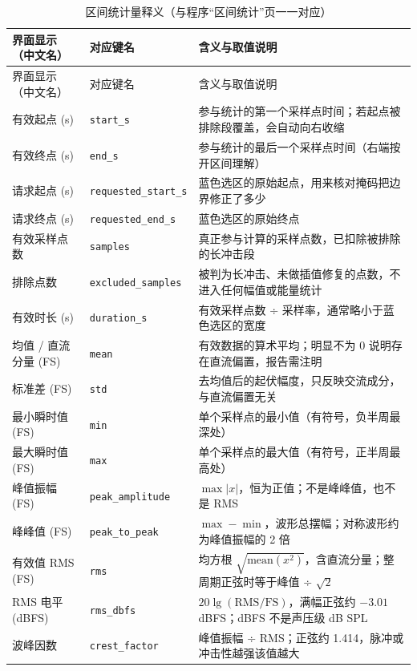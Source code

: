 \documentclass[UTF8,a4paper,12pt,scheme=chinese]{ctexart}
\begin{document}
{\small
\begin{longtable}{@{}p{}p{}p{}@{}}
\caption{区间统计量释义（与程序“区间统计”页一一对应）}\\
\toprule
界面显示（中文名） & 对应键名 & 含义与取值说明 \\
\midrule
\endfirsthead
\toprule
界面显示（中文名） & 对应键名 & 含义与取值说明 \\
\midrule
\endhead
\bottomrule
\endfoot
有效起点 (s) & \texttt{start\_s} & 参与统计的第一个采样点时间；若起点被排除段覆盖，会自动向右收缩 \\
有效终点 (s) & \texttt{end\_s} & 参与统计的最后一个采样点时间（右端按开区间理解） \\
请求起点 (s) & \texttt{requested\_start\_s} & 蓝色选区的原始起点，用来核对掩码把边界修正了多少 \\
请求终点 (s) & \texttt{requested\_end\_s} & 蓝色选区的原始终点 \\
有效采样点数 & \texttt{samples} & 真正参与计算的采样点数，已扣除被排除的长冲击段 \\
排除点数 & \texttt{excluded\_samples} & 被判为长冲击、未做插值修复的点数，不进入任何幅值或能量统计 \\
有效时长 (s) & \texttt{duration\_s} & 有效采样点数 ÷ 采样率，通常略小于蓝色选区的宽度 \\
均值 / 直流分量 (FS) & \texttt{mean} & 有效数据的算术平均；明显不为 0 说明存在直流偏置，报告需注明 \\
标准差 (FS) & \texttt{std} & 去均值后的起伏幅度，只反映交流成分，与直流偏置无关 \\
最小瞬时值 (FS) & \texttt{min} & 单个采样点的最小值（有符号，负半周最深处） \\
最大瞬时值 (FS) & \texttt{max} & 单个采样点的最大值（有符号，正半周最高处） \\
峰值振幅 (FS) & \texttt{peak\_amplitude} & $\max|x|$，恒为正值；不是峰峰值，也不是 RMS \\
峰峰值 (FS) & \texttt{peak\_to\_peak} & $\max-\min$，波形总摆幅；对称波形约为峰值振幅的 2 倍 \\
有效值 RMS (FS) & \texttt{rms} & 均方根 $\sqrt{\mathrm{mean}(x^2)}$，含直流分量；整周期正弦时等于峰值 ÷ $\sqrt{2}$ \\
RMS 电平 (dBFS) & \texttt{rms\_dbfs} & $20\lg(\mathrm{RMS}/\mathrm{FS})$，满幅正弦约 $-3.01$ dBFS；dBFS 不是声压级 dB SPL \\
波峰因数 & \texttt{crest\_factor} & 峰值振幅 ÷ RMS；正弦约 1.414，脉冲或冲击性越强该值越大 \\

\end{longtable}}
\end{document}
